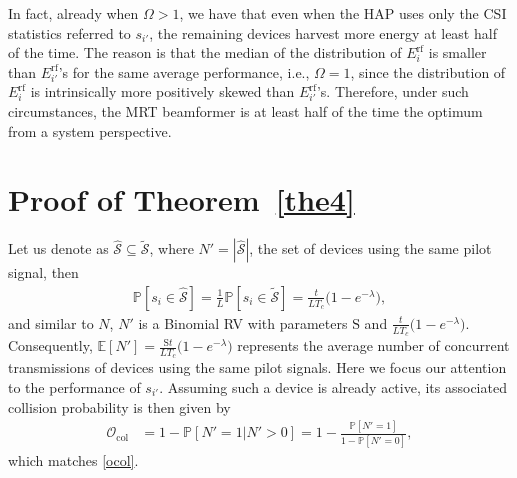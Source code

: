 \documentclass[10pt,journal,a4paper]{IEEEtran}
\begin{document}
	In fact, already when $\Omega> 1$, we have that even when the HAP uses only the CSI statistics referred to $s_{i'}$, the remaining devices harvest more energy at least half of the time. The reason is that the median of the distribution of $E_i^\mathrm{rf}$ is smaller than $E_{i'}^\mathrm{rf}$'s for the same average performance, i.e., $\Omega=1$, since the distribution of $E_i^\mathrm{rf}$ is intrinsically more positively skewed than $E_{i'}^\mathrm{rf}$'s. Therefore, under such circumstances, the MRT beamformer is at least half of the time the optimum from a system perspective.   \hfill 	\qedsymbol

\section{Proof of Theorem~\ref{the4}}\label{App_C}
%
Let us denote as $\hat{\mathcal{S}}\subseteq\tilde{\mathcal{S}}$, where $N'=|\hat{\mathcal{S}}|$, the set of devices using the same pilot signal, then
%
\begin{align}
\mathbb{P}[s_i\in\hat{\mathcal{S}}]=\frac{1}{L}\mathbb{P}[s_i\in\tilde{\mathcal{S}}]=\frac{t}{LT_c}\big(1-e^{-\lambda}\big),\label{ps2}
\end{align}
%
and similar to $N$, $N'$ is a Binomial RV with parameters $\mathrm{S}$ and $\frac{t}{LT_c}\big(1-e^{-\lambda}\big)$. Consequently,  $\mathbb{E}[N']\!=\frac{\mathrm{S}t}{LT_c}\big(1-e^{-\lambda}\big)$ represents the average number of concurrent transmissions of devices using the same pilot signals.
Here we focus our attention to the performance of $s_{i'}$. 
Assuming such a device is already active, its associated collision probability is then given by 
%
\begin{align}
\mathcal{O}_\mathrm{col}&=1-\mathbb{P}[N'=1|N'>0]=1-\frac{\mathbb{P}[N'=1]}{1-\mathbb{P}[N'=0]},
\end{align}
which matches \eqref{ocol}. \hfill	\qedsymbol
%
\end{document}
